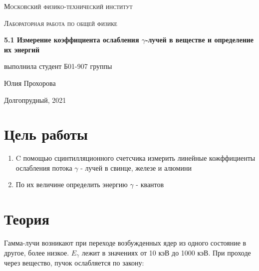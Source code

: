 \documentclass[a4paper]{article}
\begin{document}
\graphicspath{ {pictures/} }

\begin{titlepage}
	\centering
	\vspace{5cm}
    {\scshape\LARGE Московский физико-технический институт\par}
	\vspace{5cm}
	{\scshape\Large Лабораторная работа по общей физике \par}
	\vspace{1cm}
    {\huge\bfseries  5.1 Измерение коэффициента ослабления $\gamma$-лучей в веществе
    и определение их энергий \par}
	\vspace{1cm}
	\vfill
    \begin{flushright}
        {\large выполнила студент Б01-907 группы}\par
        \vspace{0.3cm}
        {\LARGE Юлия Прохорова}
    \end{flushright}
	\vfill
Долгопрудный, 2021
\end{titlepage}

\pagestyle{fancy} 
\fancyhead[C]{}
\fancyfoot[C]{ \noindent\rule{\textwidth}{0.4pt} \thepage }

\tableofcontents

\newpage



\section{Цель работы}

\begin{enumerate}
    \item  C помощью сцинтилляционного счетсчика измерить линейные кожффициенты ослабления потока $\gamma$ - лучей в свинце,
    железе и алюмини
    \item  По их величине определить энергию $\gamma$ - квантов
\end{enumerate}



\section{Теория}

Гамма-лучи возникают при переходе возбужденных ядер из одного состояние в другое, более низкое. 
$E_{\gamma}$ лежит в значениях от 10 кэВ до 1000 кэВ. При проходе через вещество, пучок ослабляется по закону:
\end{document}
